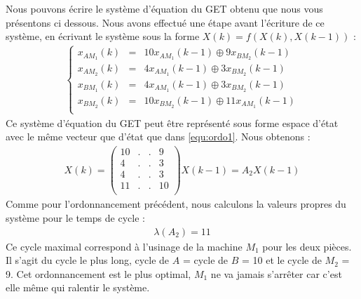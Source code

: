 Nous pouvons écrire le système d'équation du GET obtenu que nous vous présentons ci dessous. Nous avons effectué une étape avant l'écriture de ce système, en écrivant le système sous la forme $X(k)=f(X(k),X(k-1))$ :
\begin{align*}%
\left\lbrace
\begin{array}{lcl}
x_{AM_1}(k)&=& 10x_{AM_1}(k-1) \oplus  9x_{BM_2}(k-1)\\
x_{AM_2}(k)&=&  4x_{AM_1}(k-1) \oplus  3x_{BM_2}(k-1)\\
x_{BM_1}(k)&=&  4x_{AM_1}(k-1) \oplus  3x_{BM_2}(k-1)\\
x_{BM_2}(k)&=& 10x_{BM_2}(k-1) \oplus 11x_{AM_1}(k-1)\\
\end{array}
\right.
\end{align*}
Ce système d'équation du GET peut être représenté sous forme espace d'état avec le même vecteur que d'état que dans \ref{equ:ordo1}. Nous obtenons :
\begin{align}\label{eqn:eeOrdo3}
X(k) = \begin{pmatrix}
10 & . &. & 9\\
4 &. &. & 3\\
4 &. &. & 3\\
11 &. &. & 10\\
\end{pmatrix}X(k-1) = A_2X(k-1)
\end{align} 
Comme pour l'ordonnancement précédent, nous calculons la valeurs propres du système pour le temps de cycle : 
\begin{eqnarray*}
\lambda(A_2) = 11  
\end{eqnarray*}
Ce cycle maximal correspond à l'usinage de la machine $M_1$ pour les deux pièces. Il s'agit du cycle le plus long, cycle de $A$ = cycle de $B$ = 10 et le cycle de $M_2$ = 9. Cet ordonnancement est le plus optimal, $M_1$ ne va jamais s'arrêter car c'est elle même qui ralentir le système. 
